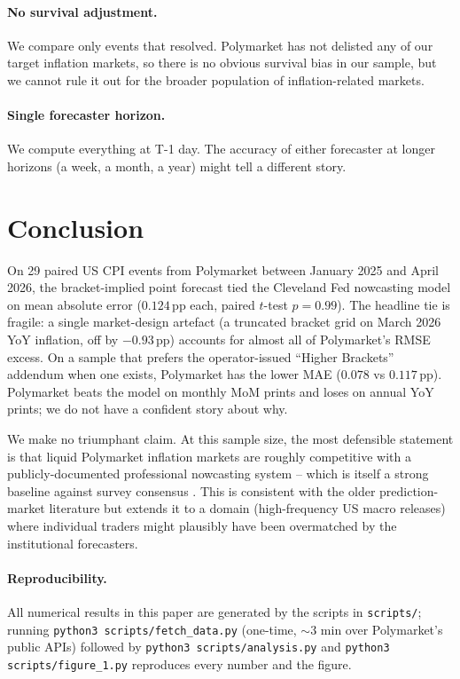 \documentclass{article}
\begin{document}
\paragraph{No survival adjustment.}  We compare only events that
resolved.  Polymarket has not delisted any of our target inflation
markets, so there is no obvious survival bias in our sample, but we
cannot rule it out for the broader population of inflation-related
markets.

\paragraph{Single forecaster horizon.}  We compute everything at
T-1 day.  The accuracy of either forecaster at longer horizons (a
week, a month, a year) might tell a different story.

\section{Conclusion}

On 29 paired US CPI events from Polymarket between January 2025 and
April 2026, the bracket-implied point forecast tied the Cleveland Fed
nowcasting model on mean absolute error
($0.124$\,pp each, paired $t$-test $p = 0.99$).  The headline tie is
fragile: a single market-design artefact (a truncated bracket grid
on March 2026 YoY inflation, off by $-0.93$\,pp) accounts for almost
all of Polymarket's RMSE excess.  On a sample that prefers the
operator-issued ``Higher Brackets'' addendum when one exists,
Polymarket has the lower MAE ($0.078$ vs $0.117$\,pp).
Polymarket beats the model on monthly MoM prints and loses on annual
YoY prints; we do not have a confident story about why.

We make no triumphant claim.  At this sample size, the most defensible
statement is that liquid Polymarket inflation markets are roughly
competitive with a publicly-documented professional nowcasting system
-- which is itself a strong baseline against survey consensus
\citep{knotek2017nowcasting}.  This is consistent with the older
prediction-market literature \citep{wolfers2004prediction,
snowberg2013prediction} but extends it to a domain (high-frequency
US macro releases) where individual traders might plausibly have been
overmatched by the institutional forecasters.

\paragraph{Reproducibility.}  All numerical results in this paper are
generated by the scripts in \texttt{scripts/}; running
\texttt{python3 scripts/fetch\_data.py} (one-time, $\sim$3 min over
Polymarket's public APIs) followed by
\texttt{python3 scripts/analysis.py} and
\texttt{python3 scripts/figure\_1.py} reproduces every number and
the figure.



\end{document}
